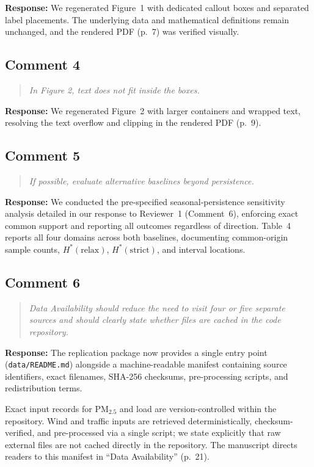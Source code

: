 \documentclass[11pt,a4paper]{article}
\newenvironment{reviewcomment}
  {\begin{quote}\itshape}
  {\end{quote}}
\newcommand{\response}{\noindent\textbf{Response:} }
\begin{document}
\response
We regenerated Figure~1 with dedicated callout boxes and separated label
placements. The underlying data and mathematical definitions remain unchanged,
and the rendered PDF (p.~7) was verified visually.


\subsection*{Comment 4}

\begin{reviewcomment}
In Figure 2, text does not fit inside the boxes.
\end{reviewcomment}

\response
We regenerated Figure~2 with larger containers and wrapped text, resolving the
text overflow and clipping in the rendered PDF (p.~9).


\subsection*{Comment 5}

\begin{reviewcomment}
If possible, evaluate alternative baselines beyond persistence.
\end{reviewcomment}

\response
We conducted the pre-specified seasonal-persistence sensitivity analysis
detailed in our response to Reviewer~1 (Comment~6), enforcing exact common
support and reporting all outcomes regardless of direction. Table~4 reports
all four domains across both baselines, documenting common-origin sample
counts, $H^*(\mathrm{relax})$, $H^*(\mathrm{strict})$, and interval locations.


\subsection*{Comment 6}

\begin{reviewcomment}
Data Availability should reduce the need to visit four or five separate
sources and should clearly state whether files are cached in the code
repository.
\end{reviewcomment}

\response
The replication package now provides a single entry point
(\texttt{data/README.md}) alongside a machine-readable manifest containing
source identifiers, exact filenames, SHA-256 checksums, pre-processing
scripts, and redistribution terms.

Exact input records for PM$_{2.5}$ and load are version-controlled within the
repository. Wind and traffic inputs are retrieved deterministically,
checksum-verified, and pre-processed via a single script; we state explicitly
that raw external files are not cached directly in the repository. The
manuscript directs readers to this manifest in ``Data Availability'' (p.~21).
\end{document}
